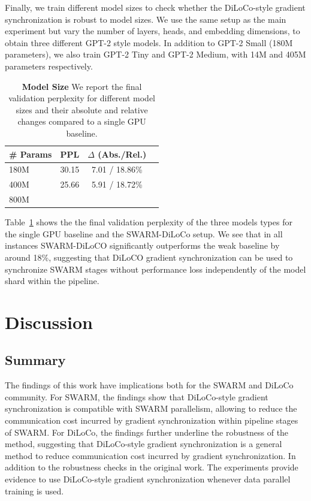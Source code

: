 \documentclass{article}
\begin{document}
Finally, we train different model sizes to check whether the DiLoCo-style
gradient synchronization is robust to model sizes. We use the same setup as the
main experiment but vary the number of layers, heads, and embedding dimensions,
to obtain three different GPT-2 style models. In addition to GPT-2 Small (180M
parameters), we also train GPT-2 Tiny and GPT-2 Medium, with 14M and 405M
parameters respectively.

\begin{table}[ht]
\centering
\begin{tabular}{lccc}
\toprule
\textbf{\# Params} & \textbf{PPL} & \textbf{$\Delta$ (Abs./Rel.)} \\ 
\midrule
180M & 30.15 & 7.01 / 18.86\% \\
400M & 25.66 & 5.91 / 18.72\% \\
800M & & & \\
\bottomrule
\end{tabular}
\caption{\textbf{Model Size} We report the final validation perplexity for
different model sizes and their absolute and relative changes compared to a single GPU baseline.}
\label{tab:experiment3}
\end{table}

Table~\ref{tab:experiment3} shows the the final validation perplexity of the
three models types for the single GPU baseline and the SWARM-DiLoCo setup. We
see that in all instances SWARM-DiLoCO significantly outperforms the weak
baseline by around 18\%, suggesting that DiLoCO gradient synchronization can be
used to synchronize SWARM stages without performance loss independently of the
model shard within the pipeline.

\section{Discussion}

\subsection{Summary}

The findings of this work have implications both for the SWARM and DiLoCo
community. For SWARM, the findings show that DiLoCo-style gradient
synchronization is compatible with SWARM parallelism, allowing to reduce the
communication cost incurred by gradient synchronization within pipeline stages
of SWARM. For DiLoCo, the findings further underline the robustness of the
method, suggesting that DiLoCo-style gradient synchronization is a general
method to reduce communication cost incurred by gradient synchronization. In
addition to the robustness checks in the original work. The experiments provide
evidence to use DiLoCo-style gradient synchronization whenever data parallel
training is used.
\end{document}
